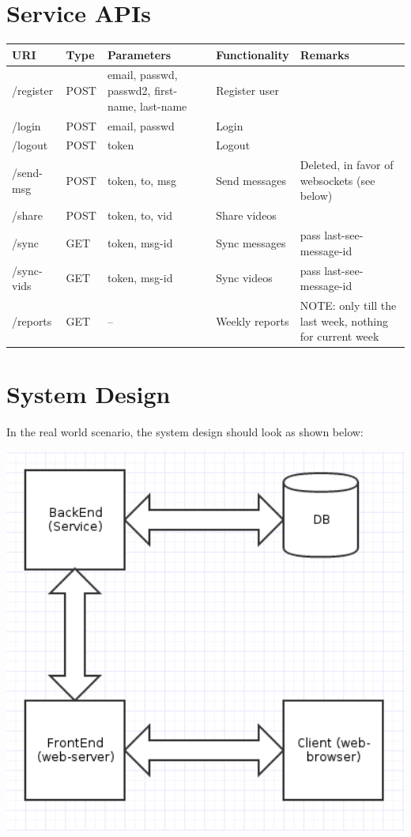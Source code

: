 \documentclass[a4paper, 10pt]{article}
\begin{document}
\section{Service APIs}
\begin{tabular}[]{|l|l|p{4.8cm}|p{2.2cm}|p{5cm}|}
  \hline
  URI & Type & Parameters & Functionality & Remarks \\ \hline
  /register & POST & email, passwd, passwd2, first-name, last-name & Register user & \\ \hline
  /login & POST & email, passwd & Login & \\ \hline
  /logout & POST & token & Logout & \\ \hline
  /send-msg & POST & token, to, msg & Send messages & Deleted, in favor of websockets (see below) \\ \hline
  /share & POST & token, to, vid & Share videos & \\ \hline
  /sync & GET & token, msg-id & Sync messages & pass last-see-message-id \\ \hline
  /sync-vids & GET & token, msg-id & Sync videos & pass last-see-message-id \\ \hline
  /reports & GET & -- & Weekly reports & NOTE: only till the last week, nothing for current week \\ \hline
\end{tabular}

\section{System Design}
In the real world scenario, the system design should look as shown below:

\includegraphics[width=6in]{ideal.png}
\end{document}
